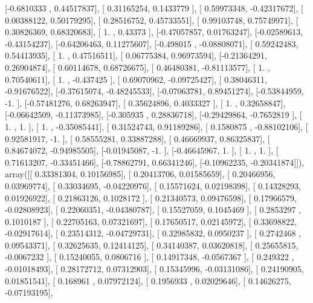 \documentclass{article}
\begin{document}
       [-0.6810333 ,  0.44517837],
       [ 0.31165254,  0.1433779 ],
       [ 0.59973348, -0.42317672],
       [ 0.00388122,  0.50179295],
       [ 0.28516752,  0.45733551],
       [ 0.99103748,  0.75749971],
       [ 0.30826369,  0.68320683],
       [ 1.        ,  0.43373   ],
       [-0.47057857,  0.01763247],
       [-0.02589613, -0.43154237],
       [-0.64206463,  0.11275607],
       [-0.498015  , -0.08808071],
       [ 0.59242483,  0.54413935],
       [ 1.        ,  0.47516511],
       [ 0.06775384,  0.96973594],
       [-0.21364291,  0.26904874],
       [ 0.60114678,  0.68726675],
       [ 0.46480381, -0.81113577],
       [ 1.        ,  0.70540611],
       [ 1.        , -0.437425  ],
       [ 0.69070962, -0.09725427],
       [ 0.38046311, -0.91676522],
       [-0.37615074, -0.48245533],
       [-0.07063781,  0.89451274],
       [-0.53844959, -1.        ],
       [-0.57481276,  0.68263947],
       [ 0.35624896,  0.4033327 ],
       [ 1.        ,  0.32658847],
       [-0.06642509, -0.11373985],
       [-0.305935  ,  0.28836718],
       [-0.29429864, -0.7652819 ],
       [ 1.        ,  1.        ],
       [ 1.        , -0.35085441],
       [ 0.31524743,  0.91189286],
       [ 0.1580875 , -0.88102106],
       [ 0.92581917, -1.        ],
       [ 0.58555281,  0.33887288],
       [ 0.46669937,  0.86325837],
       [ 0.84674072, -0.94985505],
       [-0.01945087, -1.        ],
       [-0.46645967,  1.        ],
       [ 1.        ,  1.        ],
       [ 0.71613207, -0.33451466],
       [-0.78862791,  0.66341246],
       [-0.10962235, -0.20341874]]), array([[ 0.33381304,  0.10156985],
       [ 0.20413706,  0.01585659],
       [ 0.20466956,  0.03969774],
       [ 0.33034695, -0.04220976],
       [ 0.15571624,  0.02198398],
       [ 0.14328293,  0.01926922],
       [ 0.21863126,  0.1028172 ],
       [ 0.21340573,  0.09476598],
       [ 0.17966579, -0.02808923],
       [ 0.22060351, -0.04380787],
       [ 0.15527059,  0.1045469 ],
       [ 0.2853297 ,  0.1010187 ],
       [ 0.22705163,  0.07321697],
       [ 0.17650517,  0.02145972],
       [ 0.33698822, -0.02917614],
       [ 0.23514312, -0.04729731],
       [ 0.32985832,  0.0950237 ],
       [ 0.2742468 ,  0.09543371],
       [ 0.32625635,  0.12414125],
       [ 0.34140387,  0.03620818],
       [ 0.25655815, -0.0067232 ],
       [ 0.15240055,  0.0806716 ],
       [ 0.14917348, -0.0567367 ],
       [ 0.249322  , -0.01018493],
       [ 0.28172712,  0.07312903],
       [ 0.15345996, -0.03131086],
       [ 0.24190905,  0.01851541],
       [ 0.168961  ,  0.07972124],
       [ 0.1956933 ,  0.02029646],
       [ 0.14626275, -0.07193195],
\end{document}
